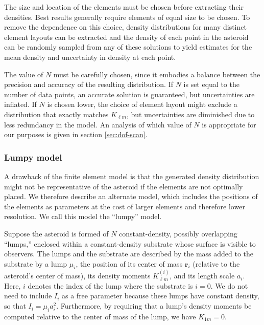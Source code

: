 \documentclass[fleqn,usenatbib]{mnras}
\begin{document}
The size and location of the elements must be chosen before extracting their densities. Best results generally require elements of equal size to be chosen. To remove the dependence on this choice, density distributions for many distinct element layouts can be extracted and the density of each point in the asteroid can be randomly sampled from any of these solutions to yield estimates for the mean density and uncertainty in density at each point.

The value of $N$ must be carefully chosen, since it embodies a balance between the precision and accuracy of the resulting distribution. If $N$ is set equal to the number of data points, an accurate solution is  guaranteed, but uncertainties are inflated. If $N$ is chosen lower, the choice of element layout might exclude a distribution that exactly matches $K_{\ell m}$, but uncertainties are diminished due to less redundancy in the model. An analysis of which value of $N$ is appropriate for our purposes is given in section \ref{sec:dof-scan}.

\subsubsection{Lumpy model}

A drawback of the finite element model is that the generated density distribution might not be representative of the asteroid if the elements are not optimally placed. We therefore describe an alternate model, which includes the positions of the elements as parameters at the cost of larger elements and therefore lower resolution. We call this model the ``lumpy'' model.

Suppose the asteroid is formed of $N$ constant-density, possibly overlapping ``lumps,'' enclosed within a constant-density substrate whose surface is visible to observers. The lumps and the substrate are described by the mass added to the substrate by a lump $\mu_i$, the position of its center of mass $\bm r_i$ (relative to the asteroid's center of mass), its density moments $K_{\ell m}^{(i)}$, and its length scale $a_i$. Here, $i$ denotes the index of the lump where the substrate is $i=0$.  We do not need to include $I_i$ as a free parameter because these lumps have constant density, so that $I_i = \mu_i a_i^2$. Furthermore, by requiring that a lump's density moments be computed relative to the center of mass of the lump, we have $K_{1m} = 0$.
\end{document}
